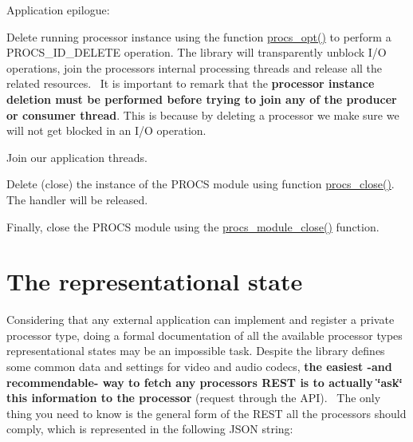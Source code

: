 \begin{DoxyItemize}
\begin{DoxyEnumerate}
\end{DoxyEnumerate}
\item Application epilogue\+:
\begin{DoxyEnumerate}
\item Delete running processor instance using the function \textquotesingle{}\hyperlink{procs_8c_a7af2e6f2788006cfc96ca8d811922ffa}{procs\+\_\+opt()}\textquotesingle{} to perform a \textquotesingle{}P\+R\+O\+C\+S\+\_\+\+I\+D\+\_\+\+D\+E\+L\+E\+TE\textquotesingle{} operation. The library will transparently unblock I/O operations, join the processor\textquotesingle{}s internal processing threads and release all the related resources.~\newline
 It is important to remark that the {\bfseries processor instance deletion must be performed before trying to join any of the producer or consumer thread}. This is because by deleting a processor we make sure we will not get blocked in an I/O operation.
\item Join our application threads.
\item Delete (close) the instance of the P\+R\+O\+CS module using function \textquotesingle{}\hyperlink{procs_8c_a0806c10ed3203ce53115ffb1a89e83d3}{procs\+\_\+close()}\textquotesingle{}. The handler will be released.
\item Finally, close the P\+R\+O\+CS module using the \textquotesingle{}\hyperlink{procs_8c_a0947527d95117e432f21354103c390a6}{procs\+\_\+module\+\_\+close()}\textquotesingle{} function. ~\newline

\end{DoxyEnumerate}
\end{DoxyItemize}\hypertarget{md_DOCUMENTATION_How_to_use_a_Processor_the_REST}{}\section{The representational state }\label{md_DOCUMENTATION_How_to_use_a_Processor_the_REST}
Considering that any external application can implement and register a private processor type, doing a formal documentation of all the available processor types representational states may be an impossible task. Despite the library defines some common data and settings for video and audio codecs, {\bfseries the easiest -\/and recommendable-\/ way to fetch any processor\textquotesingle{}s R\+E\+ST is to actually \char`\"{}ask\char`\"{} this information to the processor} (request through the A\+PI).~\newline
 The only thing you need to know is the general form of the R\+E\+ST all the processors should comply, which is represented in the following J\+S\+ON string\+:~\newline
 
